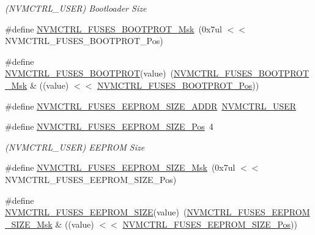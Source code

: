 \begin{DoxyCompactItemize}
\begin{DoxyCompactList}\small\item\em (N\+V\+M\+C\+T\+R\+L\+\_\+\+U\+S\+ER) Bootloader Size \end{DoxyCompactList}\item 
\#define \mbox{\hyperlink{group__fuses__api_ga88a9f3dd3aa15ef56a9867ae71bf5fce}{N\+V\+M\+C\+T\+R\+L\+\_\+\+F\+U\+S\+E\+S\+\_\+\+B\+O\+O\+T\+P\+R\+O\+T\+\_\+\+Msk}}~(0x7ul $<$$<$ N\+V\+M\+C\+T\+R\+L\+\_\+\+F\+U\+S\+E\+S\+\_\+\+B\+O\+O\+T\+P\+R\+O\+T\+\_\+\+Pos)
\item 
\#define \mbox{\hyperlink{group__fuses__api_gabba1dc9ec174e4c2a55fca8795d56aa8}{N\+V\+M\+C\+T\+R\+L\+\_\+\+F\+U\+S\+E\+S\+\_\+\+B\+O\+O\+T\+P\+R\+OT}}(value)~(\mbox{\hyperlink{group__fuses__api_ga88a9f3dd3aa15ef56a9867ae71bf5fce}{N\+V\+M\+C\+T\+R\+L\+\_\+\+F\+U\+S\+E\+S\+\_\+\+B\+O\+O\+T\+P\+R\+O\+T\+\_\+\+Msk}} \& ((value) $<$$<$ \mbox{\hyperlink{group__fuses__api_gac2867e0c1d1fc1b327991134a24983ca}{N\+V\+M\+C\+T\+R\+L\+\_\+\+F\+U\+S\+E\+S\+\_\+\+B\+O\+O\+T\+P\+R\+O\+T\+\_\+\+Pos}}))
\item 
\#define \mbox{\hyperlink{group__fuses__api_ga9f56c050e270b536768d2b27081faac5}{N\+V\+M\+C\+T\+R\+L\+\_\+\+F\+U\+S\+E\+S\+\_\+\+E\+E\+P\+R\+O\+M\+\_\+\+S\+I\+Z\+E\+\_\+\+A\+D\+DR}}~\mbox{\hyperlink{group___s_a_m_d21_j18_a__base_ga7a7a83a5753fa323b61536e396083c99}{N\+V\+M\+C\+T\+R\+L\+\_\+\+U\+S\+ER}}
\item 
\#define \mbox{\hyperlink{group__fuses__api_gad4d1aae7645f998f9be29556ae21136b}{N\+V\+M\+C\+T\+R\+L\+\_\+\+F\+U\+S\+E\+S\+\_\+\+E\+E\+P\+R\+O\+M\+\_\+\+S\+I\+Z\+E\+\_\+\+Pos}}~4
\begin{DoxyCompactList}\small\item\em (N\+V\+M\+C\+T\+R\+L\+\_\+\+U\+S\+ER) E\+E\+P\+R\+OM Size \end{DoxyCompactList}\item 
\#define \mbox{\hyperlink{group__fuses__api_gab5af398b29da2f557c6e364dd6c13397}{N\+V\+M\+C\+T\+R\+L\+\_\+\+F\+U\+S\+E\+S\+\_\+\+E\+E\+P\+R\+O\+M\+\_\+\+S\+I\+Z\+E\+\_\+\+Msk}}~(0x7ul $<$$<$ N\+V\+M\+C\+T\+R\+L\+\_\+\+F\+U\+S\+E\+S\+\_\+\+E\+E\+P\+R\+O\+M\+\_\+\+S\+I\+Z\+E\+\_\+\+Pos)
\item 
\#define \mbox{\hyperlink{group__fuses__api_ga646501eee0f33491dd39c0a67ab7e933}{N\+V\+M\+C\+T\+R\+L\+\_\+\+F\+U\+S\+E\+S\+\_\+\+E\+E\+P\+R\+O\+M\+\_\+\+S\+I\+ZE}}(value)~(\mbox{\hyperlink{group__fuses__api_gab5af398b29da2f557c6e364dd6c13397}{N\+V\+M\+C\+T\+R\+L\+\_\+\+F\+U\+S\+E\+S\+\_\+\+E\+E\+P\+R\+O\+M\+\_\+\+S\+I\+Z\+E\+\_\+\+Msk}} \& ((value) $<$$<$ \mbox{\hyperlink{group__fuses__api_gad4d1aae7645f998f9be29556ae21136b}{N\+V\+M\+C\+T\+R\+L\+\_\+\+F\+U\+S\+E\+S\+\_\+\+E\+E\+P\+R\+O\+M\+\_\+\+S\+I\+Z\+E\+\_\+\+Pos}}))

\end{DoxyCompactItemize}
